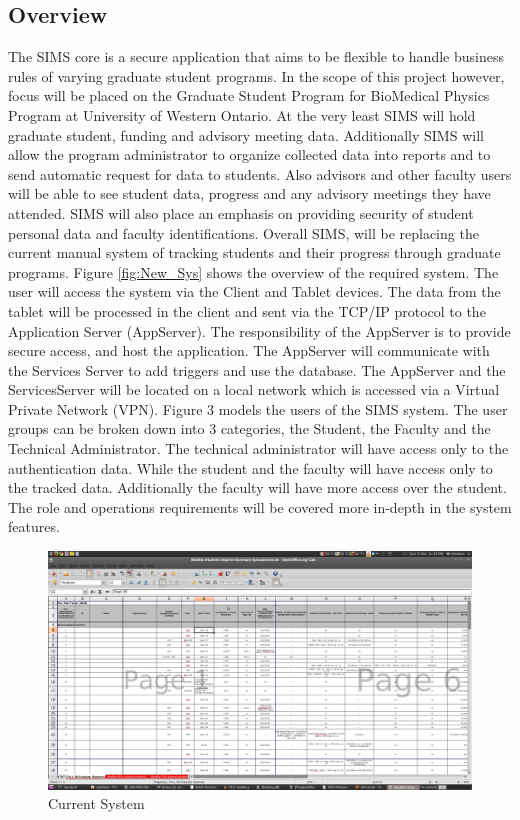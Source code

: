 \documentclass[11pt,a4paper]{report}
\begin{document}
\subsection{Overview}
The SIMS core is a secure application that aims to be flexible to handle business rules of varying graduate
student programs. In the scope of this project however, focus will be placed on the Graduate Student
Program for BioMedical Physics Program at University of Western Ontario. At the very least SIMS
will hold graduate student, funding and advisory meeting data. Additionally SIMS will allow the program
administrator to organize collected data into reports and to send automatic request for data to students.
Also advisors and other faculty users will be able to see student data, progress and any advisory meetings
they have attended. SIMS will also place an emphasis on providing security of student personal data and
faculty identifications. Overall SIMS, will be replacing the current manual system of tracking students and
their progress through graduate programs.
Figure \ref{fig:New_Sys} shows the overview of the required system. The user will access the system via the Client and
Tablet devices. The data from the tablet will be processed in the client and sent via the TCP/IP protocol
to the Application Server (AppServer). The responsibility of the AppServer is to provide secure access, and
host the application. The AppServer will communicate with the Services Server to add triggers and use the
database. The AppServer and the ServicesServer will be located on a local network which is accessed via
a Virtual Private Network (VPN). Figure 3 models the users of the SIMS system. The user groups can be
broken down into 3 categories, the Student, the Faculty and the Technical Administrator. The technical
administrator will have access only to the authentication data. While the student and the faculty will have
access only to the tracked data. Additionally the faculty will have more access over the student. The role
and operations requirements will be covered more in-depth in the system features.
\begin{figure}[htp]
\centering
\includegraphics[scale=0.25]{diagrams/Current_System.png}
\caption{Current System}
\label{fig:Curr_Sys}
\end{figure}
\end{document}
